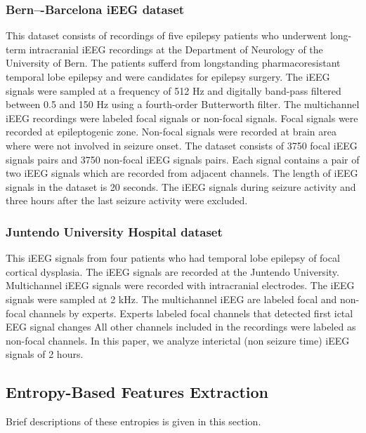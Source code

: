 \documentclass[letterpaper, 10 pt, conference]{ieeeconf}  %
\begin{document}
\subsubsection{Bern–-Barcelona iEEG dataset}
This dataset consists of recordings of five epilepsy patients who underwent long-term intracranial iEEG recordings at the Department of Neurology of the University of Bern. 
The patients sufferd from longstanding pharmacoresistant temporal lobe epilepsy and were candidates for epilepsy surgery. 
The iEEG signals were sampled at a frequency of 512 Hz and digitally band-pass filtered between 0.5 and 150 Hz using a fourth-order Butterworth filter. 
The multichannel iEEG recordings were labeled focal signals or non-focal signals. 
Focal signals were recorded at epileptogenic zone. 
Non-focal signals were recorded at brain area where were not involved in seizure onset. 
The dataset consists of 3750 focal iEEG signals pairs and 3750 non-focal iEEG signals pairs. Each signal contains a pair of two iEEG signals which are recorded from adjacent channels. 
The length of iEEG signals in the dataset is 20 seconds. 
The iEEG signals during seizure activity and three hours after the last seizure activity were excluded. 

\subsubsection{Juntendo University Hospital dataset}
This  iEEG signals from four patients who had temporal lobe epilepsy of focal cortical dysplasia. The iEEG signals are recorded at the Juntendo University. 
Multichannel iEEG signals were recorded with intracranial electrodes. 
The iEEG signals were sampled at 2 kHz. 
The multichannel iEEG are labeled focal and non-focal channels by experts. 
Experts labeled focal channels that detected first ictal EEG signal changes All other channels included in the recordings were labeled as non-focal channels. 
In this paper, we analyze interictal (non seizure time) iEEG signals of 2 hours.

\subsection{Entropy-Based Features Extraction}
Brief descriptions of these entropies is given in this section.
\end{document}
